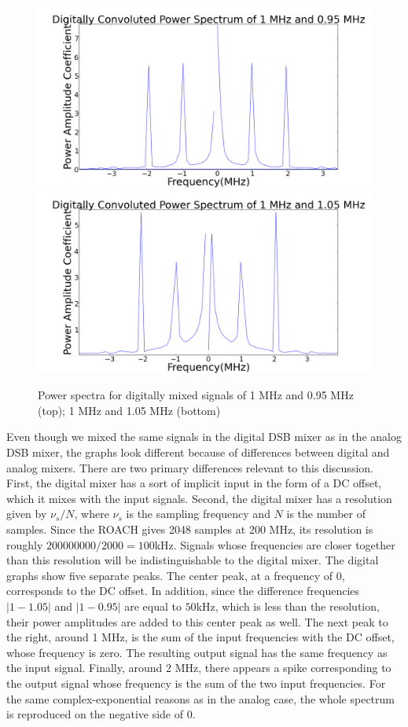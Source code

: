 \documentclass[11pt]{article}
\begin{document}
\begin{figure}
\centering
\includegraphics[scale=0.35]{pictures/digitaloninefive}
\includegraphics[scale=0.35]{pictures/digitaloneofive}
\caption{Power spectra for digitally mixed signals of 1 MHz and 0.95 MHz (top); 1 MHz and 1.05 MHz (bottom) \label{digpow}}
\end{figure}

Even though we mixed the same signals in the digital DSB mixer as in the analog DSB mixer, the graphs look different because of differences between digital and analog mixers. There are two primary differences relevant to this discussion. First, the digital mixer has a sort of implicit input in the form of a DC offset, which it mixes with the input signals. Second, the digital mixer has a resolution given by $\nu_s / N$, where $\nu_s$ is the sampling frequency and $N$ is the number of samples. Since the ROACH gives 2048 samples at 200 MHz, its resolution is roughly $200000000/2000 = 100$kHz. Signals whose frequencies are closer together than this resolution will be indistinguishable to the digital mixer. The digital graphs show five separate peaks. The center peak, at a frequency of 0, corresponds to the DC offset. In addition, since the difference frequencies $|1 - 1.05|$ and $|1 - 0.95|$ are equal to $50$kHz, which is less than the resolution, their power amplitudes are added to this center peak as well. The next peak to the right, around 1 MHz, is the sum of the input frequencies with the DC offset, whose frequency is zero. The resulting output signal has the same frequency as the input signal. Finally, around 2 MHz, there appears a spike corresponding to the output signal whose frequency is the sum of the two input frequencies. For the same complex-exponential reasons as in the analog case, the whole spectrum is reproduced on the negative side of 0.
\end{document}
